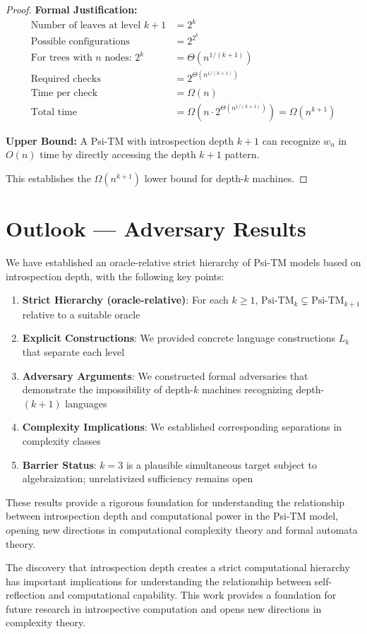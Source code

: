 \begin{proof}
\textbf{Formal Justification:}
\begin{align*}
\text{Number of leaves at level } k+1 &= 2^k \\
\text{Possible configurations} &= 2^{2^k} \\
\text{For trees with } n \text{ nodes: } 2^k &= \Theta(n^{1/(k+1)}) \\
\text{Required checks} &= 2^{\Theta(n^{1/(k+1)})} \\
\text{Time per check} &= \Omega(n) \\
\text{Total time} &= \Omega(n \cdot 2^{\Theta(n^{1/(k+1)})}) = \Omega(n^{k+1})
\end{align*}

\textbf{Upper Bound:}
A Psi-TM with introspection depth $k+1$ can recognize $w_n$ in $O(n)$ time by directly accessing the depth $k+1$ pattern.

This establishes the $\Omega(n^{k+1})$ lower bound for depth-$k$ machines.
\end{proof}

\section{Outlook — Adversary Results}

We have established an oracle-relative strict hierarchy of Psi-TM models based on introspection depth, with the following key points:

\begin{enumerate}
\item \textbf{Strict Hierarchy (oracle-relative)}: For each $k \geq 1$, $\text{Psi-TM}_k \subsetneq \text{Psi-TM}_{k+1}$ relative to a suitable oracle
\item \textbf{Explicit Constructions}: We provided concrete language constructions $L_k$ that separate each level
\item \textbf{Adversary Arguments}: We constructed formal adversaries that demonstrate the impossibility of depth-$k$ machines recognizing depth-$(k+1)$ languages
\item \textbf{Complexity Implications}: We established corresponding separations in complexity classes
\item \textbf{Barrier Status}: $k=3$ is a plausible simultaneous target subject to algebraization; unrelativized sufficiency remains open
\end{enumerate}

These results provide a rigorous foundation for understanding the relationship between introspection depth and computational power in the Psi-TM model, opening new directions in computational complexity theory and formal automata theory.

The discovery that introspection depth creates a strict computational hierarchy has important implications for understanding the relationship between self-reflection and computational capability. This work provides a foundation for future research in introspective computation and opens new directions in complexity theory.

